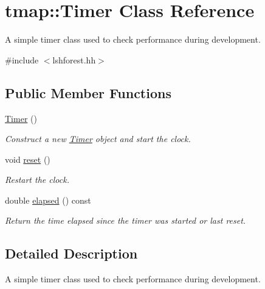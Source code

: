 \hypertarget{classtmap_1_1Timer}{}\section{tmap\+:\+:Timer Class Reference}
\label{classtmap_1_1Timer}


A simple timer class used to check performance during development.  




{\ttfamily \#include $<$lshforest.\+hh$>$}

\subsection*{Public Member Functions}
\begin{DoxyCompactItemize}
\item 
\mbox{\label{classtmap_1_1Timer_ac6eca9fca91d67ee83361136abd2ef3b}} 
\hyperlink{classtmap_1_1Timer_ac6eca9fca91d67ee83361136abd2ef3b}{Timer} ()
\begin{DoxyCompactList}\small\item\em Construct a new \hyperlink{classtmap_1_1Timer}{Timer} object and start the clock. \end{DoxyCompactList}\item 
\mbox{\label{classtmap_1_1Timer_acf16459c9388f5a3702c934e6135edf3}} 
void \hyperlink{classtmap_1_1Timer_acf16459c9388f5a3702c934e6135edf3}{reset} ()
\begin{DoxyCompactList}\small\item\em Restart the clock. \end{DoxyCompactList}\item 
double \hyperlink{classtmap_1_1Timer_a34a0281aaced5d7768c5bc60ebcd0751}{elapsed} () const
\begin{DoxyCompactList}\small\item\em Return the time elapsed since the timer was started or last reset. \end{DoxyCompactList}\end{DoxyCompactItemize}


\subsection{Detailed Description}
A simple timer class used to check performance during development. 

